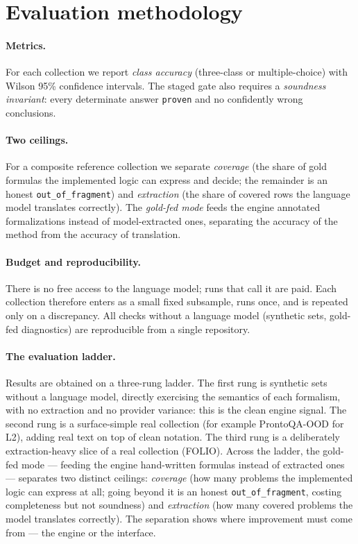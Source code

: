 \documentclass[11pt,a4paper]{article}
\begin{document}
\section{Evaluation methodology}
\label{sec:method}

\paragraph{Metrics.} For each collection we report \emph{class accuracy} (three-class or
multiple-choice) with Wilson 95\% confidence intervals. The staged gate also requires a
\emph{soundness invariant}: every determinate answer \texttt{proven} and no confidently
wrong conclusions.

\paragraph{Two ceilings.} For a composite reference collection we separate \emph{coverage}
(the share of gold formulas the implemented logic can express and decide; the remainder is
an honest \texttt{out\_of\_fragment}) and \emph{extraction} (the share of covered rows the
language model translates correctly). The \emph{gold-fed mode} feeds the engine annotated
formalizations instead of model-extracted ones, separating the accuracy of the method from
the accuracy of translation.

\paragraph{Budget and reproducibility.} There is no free access to the language model; runs
that call it are paid. Each collection therefore enters as a small fixed subsample, runs
once, and is repeated only on a discrepancy. All checks without a language model (synthetic
sets, gold-fed diagnostics) are reproducible from a single repository.

\paragraph{The evaluation ladder.} Results are obtained on a three-rung ladder. The first
rung is synthetic sets without a language model, directly exercising the semantics of each
formalism, with no extraction and no provider variance: this is the clean engine signal. The
second rung is a surface-simple real collection (for example ProntoQA-OOD for L2), adding
real text on top of clean notation. The third rung is a deliberately extraction-heavy slice
of a real collection (FOLIO). Across the ladder, the gold-fed mode --- feeding the engine
hand-written formulas instead of extracted ones --- separates two distinct ceilings:
\emph{coverage} (how many problems the implemented logic can express at all; going beyond it
is an honest \texttt{out\_of\_fragment}, costing completeness but not soundness) and
\emph{extraction} (how many covered problems the model translates correctly). The separation
shows where improvement must come from --- the engine or the interface.
\end{document}
